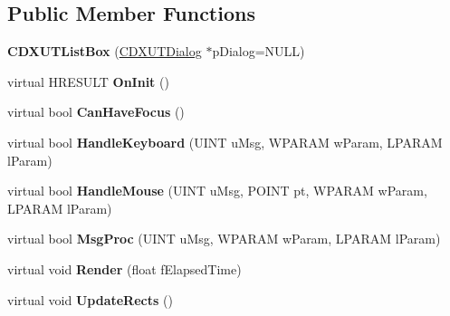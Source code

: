 \subsection*{Public Member Functions}
\begin{DoxyCompactItemize}
\item 
\hypertarget{class_c_d_x_u_t_list_box_acd6d6d877a81e65b26e01093951c3c50}{{\bfseries C\+D\+X\+U\+T\+List\+Box} (\hyperlink{class_c_d_x_u_t_dialog}{C\+D\+X\+U\+T\+Dialog} $\ast$p\+Dialog=N\+U\+L\+L)}\label{class_c_d_x_u_t_list_box_acd6d6d877a81e65b26e01093951c3c50}

\item 
\hypertarget{class_c_d_x_u_t_list_box_af999f44d44f4b6aa1f434d95317119af}{virtual H\+R\+E\+S\+U\+L\+T {\bfseries On\+Init} ()}\label{class_c_d_x_u_t_list_box_af999f44d44f4b6aa1f434d95317119af}

\item 
\hypertarget{class_c_d_x_u_t_list_box_adbe71e402fd89d6382b60a35b34c0fa9}{virtual bool {\bfseries Can\+Have\+Focus} ()}\label{class_c_d_x_u_t_list_box_adbe71e402fd89d6382b60a35b34c0fa9}

\item 
\hypertarget{class_c_d_x_u_t_list_box_a20b2dc81c2af1206a21b19f46f8300a4}{virtual bool {\bfseries Handle\+Keyboard} (U\+I\+N\+T u\+Msg, W\+P\+A\+R\+A\+M w\+Param, L\+P\+A\+R\+A\+M l\+Param)}\label{class_c_d_x_u_t_list_box_a20b2dc81c2af1206a21b19f46f8300a4}

\item 
\hypertarget{class_c_d_x_u_t_list_box_a7d184abbad5688513f0fb25d6a37528f}{virtual bool {\bfseries Handle\+Mouse} (U\+I\+N\+T u\+Msg, P\+O\+I\+N\+T pt, W\+P\+A\+R\+A\+M w\+Param, L\+P\+A\+R\+A\+M l\+Param)}\label{class_c_d_x_u_t_list_box_a7d184abbad5688513f0fb25d6a37528f}

\item 
\hypertarget{class_c_d_x_u_t_list_box_a05c8bdcfa42cb829df9b6797684ae938}{virtual bool {\bfseries Msg\+Proc} (U\+I\+N\+T u\+Msg, W\+P\+A\+R\+A\+M w\+Param, L\+P\+A\+R\+A\+M l\+Param)}\label{class_c_d_x_u_t_list_box_a05c8bdcfa42cb829df9b6797684ae938}

\item 
\hypertarget{class_c_d_x_u_t_list_box_a74768a131842e503346bdf9ac8fc0102}{virtual void {\bfseries Render} (float f\+Elapsed\+Time)}\label{class_c_d_x_u_t_list_box_a74768a131842e503346bdf9ac8fc0102}

\item 
\hypertarget{class_c_d_x_u_t_list_box_a295c60c194d1126086d26bad65a17efc}{virtual void {\bfseries Update\+Rects} ()}\label{class_c_d_x_u_t_list_box_a295c60c194d1126086d26bad65a17efc}


\end{DoxyCompactItemize}
